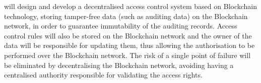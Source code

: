 \begin{Workpackage}{\thewpno}
\begin{Task}
\TaskResults{%
\ref{del:auth1},
\ref{del:auth2},
\ref{del:auth3}
}
\TaskHeader{}
\theTask{} will design and develop a decentralised access control system based on Blockchain technology, storing tamper-free data (such as auditing data) on the Blockchain network, in order to guarantee immutability of the auditing records. Access control rules will also be stored on the Blockchain network and the owner of the data will be responsible for updating them, thus allowing the authorisation to be performed over the Blockchain network.
The risk of a single point of failure will be eliminated by decentralising the Blockchain network, avoiding having a centralised authority responsible for validating the access rights. %

\end{Task}
\end{Workpackage}
